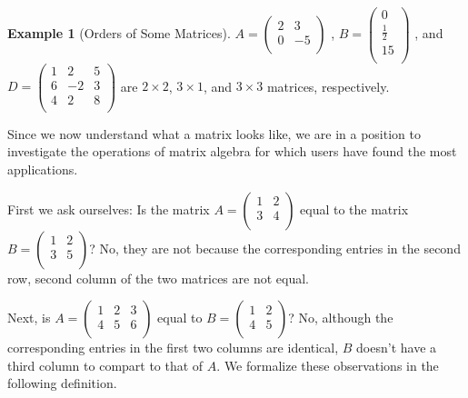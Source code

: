 \documentclass[10pt,]{book}
\theoremstyle{plain}
\theoremstyle{definition}
\theoremstyle{definition}
\theoremstyle{definition}
\newtheorem{example}[theorem]{Example}
\theoremstyle{definition}
\begin{document}
\begin{example}[Orders of Some Matrices]\label{example-orders-of-matrices}
\(A =\left(
\begin{array}{cc}
 2 & 3 \\
 0 & -5 \\
\end{array}
\right)\) , \(B =\left(
\begin{array}{c}
 0 \\
 \frac{1}{2} \\
 15 \\
\end{array}
\right)\) , and \(D =\left(
\begin{array}{ccc}
 1 & 2 & 5 \\
 6 & -2 & 3 \\
 4 & 2 & 8 \\
\end{array}
\right)\)
are \(2\times 2\), \(3\times 1\), and \(3\times 3\) matrices, respectively.%
\end{example}
\par
Since we now understand what a matrix looks like, we are in a position to investigate the operations of matrix algebra for which users have found the most applications.%
\par
First we ask ourselves: Is the matrix \(A =\left(
\begin{array}{cc}
 1 & 2 \\
 3 & 4 \\
\end{array}
\right)\) equal to the matrix \(B =\left(
\begin{array}{cc}
 1 & 2 \\
 3 & 5 \\
\end{array}
\right)\)? No, they are not because the corresponding entries in the second row, second column of the two matrices are not equal.%
\par
Next, is
 \(A =\left(
\begin{array}{ccc}
 1 & 2 & 3 \\
 4 & 5 & 6 \\
\end{array}
\right)\) equal to \(B=\left(
\begin{array}{cc}
 1 & 2 \\
 4 & 5 \\
\end{array}
\right)\)? No, although the corresponding entries in the first two columns are identical, \(B\) doesn't have a third column to compart to that of \(A\). We formalize these observations in the following definition.%
\end{document}
